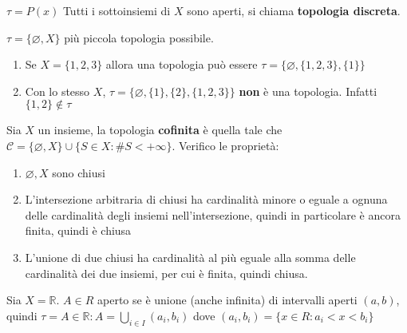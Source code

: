 \begin{example}
    \(\tau = P(x)\) Tutti i sottoinsiemi di \(X\) sono aperti, si chiama
        \textbf{topologia discreta}.
\end{example}
\begin{example}
\(\tau = \{\varnothing, X\} \) più piccola
        topologia possibile.
\end{example}
\begin{example}
\begin{enumerate}[label = \roman*-]
    \item Se \(X = \{1, 2, 3\} \) allora una topologia può essere \(\tau =
        \{\varnothing, \{1, 2, 3\}, \{1\}\} \) 
    \item Con lo stesso \(X\), \(\tau = \{\varnothing, \{1\} , \{2\} , \{1,2,3\}
        \}\) \textbf{non} è una topologia. Infatti \(\{1,2\} \not\in \tau\) 
\end{enumerate}
\end{example}
\begin{example}
    \item Sia \(X\) un insieme, la topologia \textbf{cofinita} è quella tale che
        \(\mathcal{C} = \{\varnothing, X\} \cup \{S \in X : \# S < +\infty\}
        \). Verifico le proprietà:
\begin{enumerate}[label = \arabic*)]
    \item \(\varnothing, X\) sono chiusi
    \item L'intersezione arbitraria di chiusi ha cardinalità minore o eguale a
        ognuna delle cardinalità degli insiemi nell'intersezione, quindi in
        particolare è ancora finita, quindi è chiusa
    \item L'unione di due chiusi ha cardinalità al più eguale alla somma delle
        cardinalità dei due insiemi, per cui è finita, quindi chiusa.
\end{enumerate}

\end{example}
\begin{example}
    Sia \(X = \mathbb{R}\). \(A \in  R\) aperto se è
        unione (anche infinita) di intervalli aperti \((a, b)\), quindi \(\tau =
        A \in  \mathbb{R} : A = \bigcup_{i \in  I} (a_{i}, b_{i})\) dove
        \((a_{i}, b_{i}) = \{x \in R : a_{i} < x < b_{i}\} \) 
\end{example}
